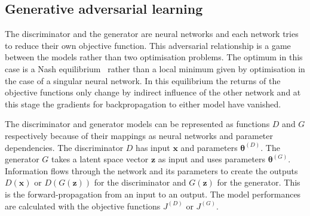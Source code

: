 \documentclass[twocolumn]{article}
\numberwithin{equation}{section}
\begin{document}

\subsection{Generative adversarial learning}
The discriminator and the generator are neural networks and each network tries to reduce their own objective function. This adversarial relationship is a game between the models rather than two optimisation problems. The optimum in this case is a Nash equilibrium~\cite{NIPS16} rather than a local minimum given by optimisation in the case of a singular neural network. In this equilibrium the returns of the objective functions only change by indirect influence of the other network and at this stage the gradients for backpropagation to either model have vanished.

The discriminator and generator models can be represented as functions $D$ and $G$ respectively because of their mappings as neural networks and parameter dependencies. The discriminator $D$ has input $\mathbf{x}$ and parameters $\bm{\theta}^{(D)}$. The generator $G$ takes a latent space vector $\mathbf{z}$ as input and uses parameters $\bm{\theta}^{(G)}$. Information flows through the network and its parameters to create the outputs $D(\mathbf{x})$ or $D(G(\mathbf{z}))$ for the discriminator and $G(\mathbf{z})$ for the generator. This is the forward-propagation from an input to an output. The model performances are calculated with the objective functions $J^{(D)}$ or $J^{(G)}$. %
\end{document}
